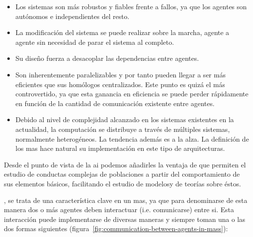 \begin{itemize}
	\item Los sistemas son más robustos y fiables frente a fallos, ya que los agentes son autónomos e independientes del resto.
	\item La modificación del sistema se puede realizar sobre la marcha, agente a agente sin necesidad de parar el sistema al completo.
	\item Su diseño fuerza a desacoplar las dependencias entre agentes.
	\item Son inherentemente paralelizables y por tanto pueden llegar a ser más eficientes que sus homólogos centralizados. Este punto es quizá el más controvertido, ya que esta ganancia en eficiencia se puede perder rápidamente en función de la cantidad de comunicación existente entre agentes.
	\item Debido al nivel de complejidad alcanzado en los sistemas existentes en la actualidad, la computación se distribuye a través de múltiples sistemas, normalmente heterogéneos. La tendencia además es a la alza. La definición de los \ac{mas} hace natural su implementación en este tipo de arquitecturas.
\end{itemize}
	
Desde el punto de vista de la \gls{ai} podemos añadirles la ventaja de que permiten el estudio de conductas complejas de poblaciones a partir del comportamiento de sus elementos básicos, facilitando el estudio de modelosy de teorías sobre éstos.

, se trata de una característica clave en un \gls{mas}, ya que para denominarse de esta manera dos o más agentes deben interactuar (i.e. comunicarse) entre si. Esta interacción puede implementarse de diversas maneras y siempre toman una o las dos formas siguientes (figura~\ref{fig:communication-between-agents-in-mass}):

